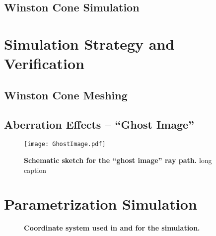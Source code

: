 \subsection{Winston Cone Simulation}

\section{Simulation Strategy and Verification}

\subsection{Winston Cone Meshing}\label{sec:wico_meshing}

\subsection{Aberration Effects -- \enquote{Ghost Image}}\label{sec:ghost_image}

\begin{figure}[H]
	\centering
	\texttt{[image: GhostImage.pdf]}
	\caption[Schematic sketch for the \enquote{ghost image} ray path]{\textbf{Schematic sketch for the \enquote{ghost image} ray path.} long caption}
	\label{ghostimage_path}
\end{figure}

\section{Parametrization Simulation}

\begin{figure}[H]
	\centering
	\begin{subfigure}[t]{0.49\textwidth}
	\end{subfigure}
	\hfill
	\begin{subfigure}[t]{0.49\textwidth}
		\usebox{\savedimage}
	\end{subfigure}
	\caption[Coordinate system used in \geant and for the simulation]{\textbf{Coordinate system used in \geant and for the simulation.} }
	\label{geant_coords}
\end{figure}